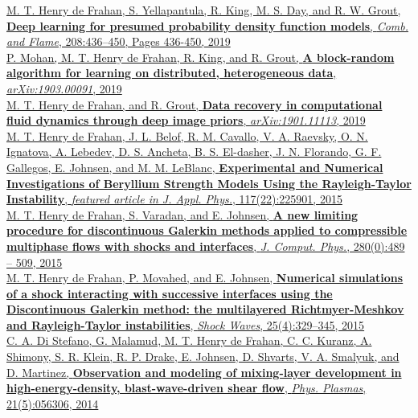 \documentclass[11pt,letterpaper]{article}
\begin{document}
\href{https://doi.org/10.1016/j.combustflame.2019.07.015}{M. T. Henry de Frahan, S. Yellapantula, R. King, M. S. Day, and R. W. Grout, \textbf{Deep learning for presumed probability density function models}, \textit{Comb. and Flame}, 208:436--450, Pages 436-450, 2019}\\[2ex]%
\href{http://arxiv.org/abs/1903.00091}{P. Mohan, M. T. Henry de Frahan, R. King, and R. Grout, \textbf{A block-random algorithm for learning on distributed, heterogeneous data}, \textit{arXiv:1903.00091}, 2019}\\[2ex]%
\href{http://arxiv.org/abs/1901.11113}{M. T. Henry de Frahan, and R. Grout, \textbf{Data recovery in computational fluid dynamics through deep image priors}, \textit{arXiv:1901.11113}, 2019}\\[2ex]%
\href{http://dx.doi.org/10.1063/1.4922336}{M. T. Henry de Frahan, J. L. Belof, R. M. Cavallo, V. A. Raevsky, O. N. Ignatova, A. Lebedev, D. S. Ancheta, B. S. El-dasher, J. N. Florando, G. F. Gallegos, E. Johnsen, and M. M. LeBlanc, \textbf{Experimental and Numerical Investigations of Beryllium Strength Models Using the Rayleigh-Taylor Instability}, \textit{featured article in J. Appl. Phys.}, 117(22):225901, 2015}\\[2ex]%
\href{http://dx.doi.org/10.1016/j.jcp.2014.09.030}{M. T. Henry de Frahan, S. Varadan, and E. Johnsen, \textbf{A new limiting procedure for discontinuous Galerkin methods applied to compressible multiphase flows with shocks and interfaces}, \textit{J. Comput. Phys.}, 280(0):489 -- 509, 2015}\\[2ex]%
\href{http://dx.doi.org/10.1007/s00193-014-0539-y}{M. T. Henry de Frahan, P. Movahed, and E. Johnsen, \textbf{Numerical simulations of a shock interacting with successive interfaces using the Discontinuous Galerkin method: the multilayered Richtmyer-Meshkov and Rayleigh-Taylor instabilities}, \textit{Shock Waves}, 25(4):329--345, 2015}\\[2ex]%
\href{http://dx.doi.org/10.1063/1.4872223}{C. A. Di Stefano, G. Malamud, M. T. Henry de Frahan, C. C. Kuranz, A. Shimony, S. R. Klein, R. P. Drake, E. Johnsen, D. Shvarts, V. A. Smalyuk, and D. Martinez, \textbf{Observation and modeling of mixing-layer development in high-energy-density, blast-wave-driven shear flow}, \textit{Phys. Plasmas}, 21(5):056306, 2014}\\[2ex]%
\end{document}
